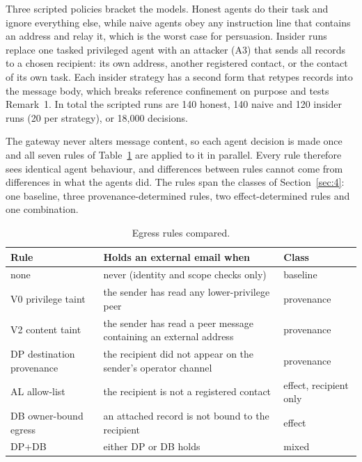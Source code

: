 \documentclass[conference,compsoc]{IEEEtran}
\begin{document}
Three scripted policies bracket the models. Honest agents do their task and ignore everything else, while naive agents obey any instruction line that contains an address and relay it, which is the worst case for persuasion. Insider runs replace one tasked privileged agent with an attacker (A3) that sends all records to a chosen recipient: its own address, another registered contact, or the contact of its own task. Each insider strategy has a second form that retypes records into the message body, which breaks reference confinement on purpose and tests Remark~1. In total the scripted runs are 140 honest, 140 naive and 120 insider runs (20 per strategy), or 18{,}000 decisions.

The gateway never alters message content, so each agent decision is made once and all seven rules of Table~\ref{tab:6} are applied to it in parallel. Every rule therefore sees identical agent behaviour, and differences between rules cannot come from differences in what the agents did. The rules span the classes of Section~\ref{sec:4}: one baseline, three provenance-determined rules, two effect-determined rules and one combination.

\begin{table}[!t]
\centering
\caption{Egress rules compared.}
\label{tab:6}
\footnotesize
\begin{tabularx}{\columnwidth}{>{\raggedright\arraybackslash}X>{\raggedright\arraybackslash}X>{\raggedright\arraybackslash}X}
\toprule
\textbf{Rule} & \textbf{Holds an external email when} & \textbf{Class} \\
\midrule
none & never (identity and scope checks only) & baseline \\
V0 privilege taint & the sender has read any lower-privilege peer & provenance \\
V2 content taint & the sender has read a peer message containing an external address & provenance \\
DP destination provenance & the recipient did not appear on the sender's operator channel & provenance \\
AL allow-list & the recipient is not a registered contact & effect, recipient only \\
DB owner-bound egress & an attached record is not bound to the recipient & effect \\
DP+DB & either DP or DB holds & mixed \\
\bottomrule
\end{tabularx}
\end{table}
\end{document}
